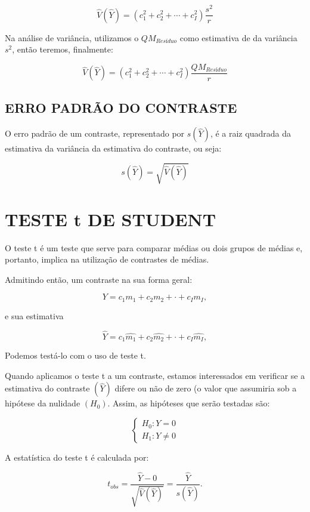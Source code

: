 \documentclass[
]{book}
\begin{document}
\[
\hat{V}(\hat{Y}) = \left( {c^2_1} + {c_2^2} + \cdots + {c^2_I} \right) \frac{s^2}{r}
\]

Na análise de variância, utilizamos o \(QM_{Resíduo}\) como estimativa de da variância \(s^2\), então teremos, finalmente:

\[
\hat{V}(\hat{Y}) = \left( {c^2_1} + {c_2^2} + \cdots + {c^2_I} \right) \frac{QM_{Resíduo}}{r}
\]

\hypertarget{erro-padruxe3o-do-contraste}{%
\subsection{ERRO PADRÃO DO CONTRASTE}\label{erro-padruxe3o-do-contraste}}

O erro padrão de um contraste, representado por \(s(\hat{Y})\), é a raiz quadrada da estimativa da variância da estimativa do contraste, ou seja:

\[
s(\hat{Y}) = \sqrt{\hat{V}(\hat{Y})}
\]

\hypertarget{teste-t-de-student}{%
\section{TESTE t DE STUDENT}\label{teste-t-de-student}}

O teste t é um teste que serve para comparar médias ou dois grupos de médias e, portanto, implica na utilização de contrastes de médias.

Admitindo então, um contraste na sua forma geral:

\[
Y= c_1m_1+c_2m_2+ \cdot + c_Im_I,
\]

e sua estimativa

\[
\hat{Y}= c_1\hat{m_1}+c_2\hat{m_2}+ \cdot + c_I\hat{m_I},
\]

Podemos testá-lo com o uso de teste t.

Quando aplicamos o teste t a um contraste, estamos interessados em verificar se a estimativa do contraste \((\hat{Y})\) difere ou não de zero (o valor que assumiria sob a hipótese da nulidade \((H_0)\). Assim, as hipóteses que serão testadas são:

\[ 
\begin{cases}
H_0: Y=0 \\
H_1: Y \neq 0
\end{cases}
\]

A estatística do teste t é calculada por:

\[
t_{obs} = \frac{\hat{Y}-0}{\sqrt{\hat{V}(\hat{Y})}} = \frac{\hat{Y}}{s(\hat{Y})}.
\]
\end{document}
